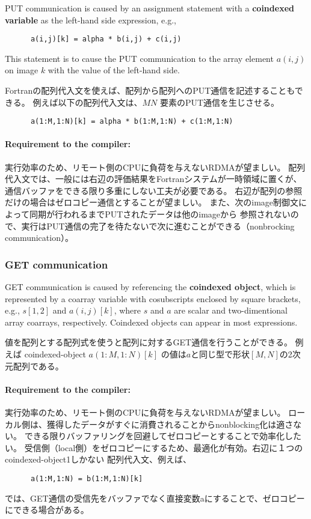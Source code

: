 PUT communication is caused by an assignment statement with a {\bf coindexed variable} 
as the left-hand side expression, e.g.,
\begin{verbatim}
      a(i,j)[k] = alpha * b(i,j) + c(i,j)
\end{verbatim}
This statement is to cause the PUT communication to the array element $a(i,j)$ on image $k$
with the value of the left-hand side.

Fortranの配列代入文を使えば、配列から配列へのPUT通信を記述することもできる。
例えば以下の配列代入文は、$M N$ 要素のPUT通信を生じさせる。
\begin{verbatim}
      a(1:M,1:N)[k] = alpha * b(1:M,1:N) + c(1:M,1:N)
\end{verbatim}

\paragraph{Requirement to the compiler:}
実行効率のため、リモート側のCPUに負荷を与えないRDMAが望ましい。
配列代入文では、一般には右辺の評価結果をFortranシステムが一時領域に置くが、
通信バッファをできる限り多重にしない工夫が必要である。
右辺が配列の参照だけの場合はゼロコピー通信とすることが望ましい。
また、次のimage制御文によって同期が行われるまでPUTされたデータは他のimageから
参照されないので、実行はPUT通信の完了を待たないで次に進むことができる（nonbrocking communication）。


\subsubsection{GET communication}

GET communication is caused by referencing the {\bf coindexed object}, 
which is represented by a coarray variable with cosubscripts enclosed by square brackets, 
e.g., $s[1,2]$ and $a(i,j)[k]$, where $s$ and $a$ are scalar and two-dimentional array coarrays,
respectively.
Coindexed objects can appear in most expressions.

値を配列とする配列式を使うと配列に対するGET通信を行うことができる。
例えば coindexed-object $a(1:M,1:N)[k]$ の値は$a$と同じ型で形状$[M, N]$の2次元配列である。


\paragraph{Requirement to the compiler:}
実行効率のため、リモート側のCPUに負荷を与えないRDMAが望ましい。
ローカル側は、獲得したデータがすぐに消費されることからnonblocking化は適さない。
できる限りバッファリングを回避してゼロコピーとすることで効率化したい。
受信側（local側）をゼロコピーにするため、最適化が有効。右辺に１つのcoindexed-object1しかない
配列代入文、例えば、
\begin{verbatim}
      a(1:M,1:N) = b(1:M,1:N)[k]
\end{verbatim}
では、GET通信の受信先をバッファでなく直接変数aにすることで、ゼロコピーにできる場合がある。



